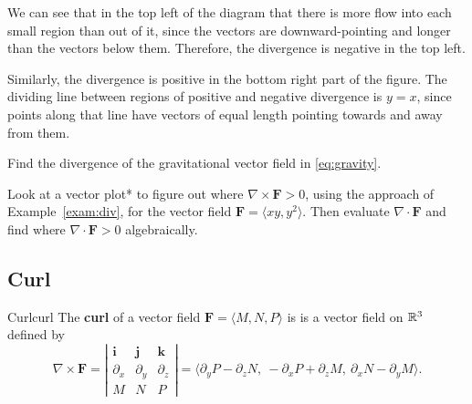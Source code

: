 \documentclass[svgnames]{report}
\begin{document}
\begin{solution}
  We can see that in the top left of the diagram that there is more
  flow into each small region than out of it, since the vectors are
  downward-pointing and longer than the vectors below them. Therefore,
  the divergence is negative in the top left.

  Similarly, the divergence is positive in the bottom right part of
  the figure. The
  dividing line between regions of positive and negative divergence is
  $y = x$, since points along that line have vectors of equal length
  pointing towards and away from them.
\end{solution}

\begin{exercise}{}{}
  Find the divergence of the gravitational vector field in
  \eqref{eq:gravity}. 
\end{exercise}

\begin{exercise}{}{}
Look
  at a vector plot*  to figure out where $\nabla \times \mathbf{F} >
  0$, using the approach of 
  Example~\ref{exam:div}, for the vector field $\mathbf{F} = \langle xy, y^2
  \rangle$. Then evaluate $\nabla \cdot \mathbf{F}$ and find where
  $\nabla \cdot \mathbf{F} > 0$ algebraically. 
\end{exercise}

\subsection{Curl}


\begin{defn}{Curl}{curl}
  The \textbf{curl} of a vector field $\mathbf{F} = \langle M, N, P \rangle$ is
  is a vector field on $\mathbb{R}^3$ defined by \renewcommand\arraystretch{1.4}
  \[
    \nabla \times \mathbf{F} =
    \left|
      \begin{array}{ccc}
        \mathbf{i} & \mathbf{j} & \mathbf{k} \\
        \partial_x  & \partial_y & \partial_z \\
              M         &       N       &      P
      \end{array} 
    \right| = \big\langle \partial_y P - \partial_z N, \:
    -\partial_x P  + \partial_z M, \:
    \partial_x N - \partial_y M \big\rangle. 
  \]
\end{defn}
\end{document}
